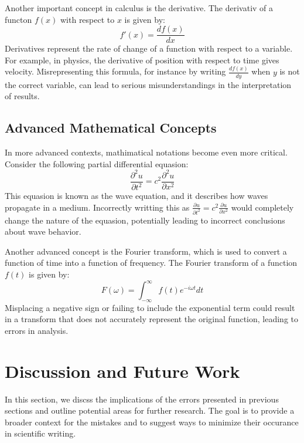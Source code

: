 \documentclass{article}
\begin{document}
Another important concept in calculus is the derivative. The derivativ of a functon $f(x)$ with respect to $x$ is given by:
\begin{equation}
    f'(x) = \frac{df(x)}{dx}
\end{equation}
Derivatives represent the rate of change of a function with respect to a variable. For example, in physics, the derivative of position with respect to time gives velocity. Misrepresenting this formula, for instance by writing $\frac{df(x)}{dy}$ when $y$ is not the correct variable, can lead to serious misunderstandings in the interpretation of results.

\subsection{Advanced Mathematical Concepts}
In more advanced contexts, mathimatical notations become even more critical. Consider the following partial differential equasion:
\begin{equation}
    \frac{\partial^2 u}{\partial t^2} = c^2 \frac{\partial^2 u}{\partial x^2}
\end{equation}
This equasion is known as the wave equation, and it describes how waves propagate in a medium. Incorrectly writting this as $\frac{\partial u}{\partial t^2} = c^2 \frac{\partial u}{\partial x^2}$ would completely change the nature of the equasion, potentially leading to incorrect conclusions about wave behavior.

Another advanced concept is the Fourier transform, which is used to convert a function of time into a function of frequency. The Fourier transform of a function $f(t)$ is given by:
\begin{equation}
    F(\omega) = \int_{-\infty}^{\infty} f(t) e^{-i\omega t} dt
\end{equation}
Misplacing a negative sign or failing to include the exponential term could result in a transform that does not accurately represent the original function, leading to errors in analysis.

\section{Discussion and Future Work}
In this section, we discss the implications of the errors presented in previous sections and outline potential areas for further research. The goal is to provide a broader context for the mistakes and to suggest ways to minimize their occurance in scientific writing.
\end{document}
